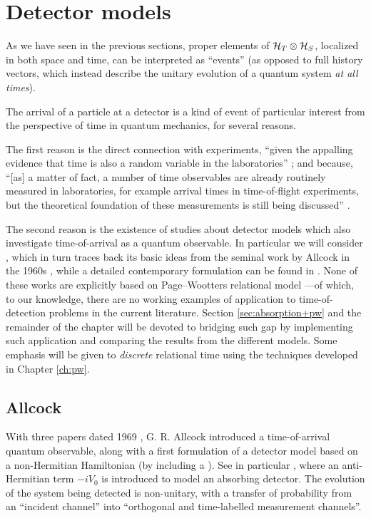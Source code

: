 \section{Detector models}

As we have seen in the previous sections,
proper elements of $\mathcal{H}_T \otimes \mathcal{H}_S$,
localized in both space and time,
can be interpreted as ``events''
(as opposed to full history vectors, which instead describe the unitary evolution
of a quantum system \emph{at all times}).

The arrival of a particle at a detector
is a kind of event
of particular interest from the perspective of time
in quantum mechanics, for several reasons.

The first reason
is the direct connection with experiments,
``given the appalling evidence that time is also a random variable in the laboratories''
\parencite[Sec. 4.1]{TQM2};
and because,
``{[as]} a matter of fact, a number of time observables are already routinely measured in laboratories,
for example arrival times in time-of-flight experiments,
but the theoretical foundation of these measurements is still being discussed''
\parencite[Preface to the First Ed.]{TQM1}.

The second reason is the existence of studies
about detector models which also investigate
time-of-arrival as a quantum observable.
In particular we will consider \cite{RuschhauptAbsorption},
which in turn traces back its basic ideas from the seminal work by Allcock
in the 1960s \parencite{Allcock-1, Allcock-2, Allcock-3},
while a detailed contemporary formulation can be found in
\cite{TQM2:Detector}.
None of these works are explicitly
based on Page--Wootters relational model ---of which, to our knowledge,
there are no working examples of application to
time-of-detection problems in the current literature.
Section \ref{sec:absorption+pw} and the remainder of the chapter
will be devoted to bridging such gap
by implementing such application
and comparing
the results from the different models.
Some emphasis will be given to
\emph{discrete} relational time
using the techniques developed in Chapter \ref{ch:pw}.

\subsection{Allcock}

With three papers dated 1969 \parencite{Allcock-1, Allcock-2, Allcock-3}, G. R. Allcock
introduced a time-of-arrival quantum observable,
along with a first formulation of a detector model based on a non-Hermitian
Hamiltonian (by including a ).
See in particular \cite[sec. II-IV]{Allcock-2}, where an anti-Hermitian term
$-iV_0$ is introduced to model an absorbing detector. The evolution of the system
being detected
is non-unitary, with a transfer of probability
from an ``incident channel''
into ``orthogonal and time-labelled measurement channels''.


